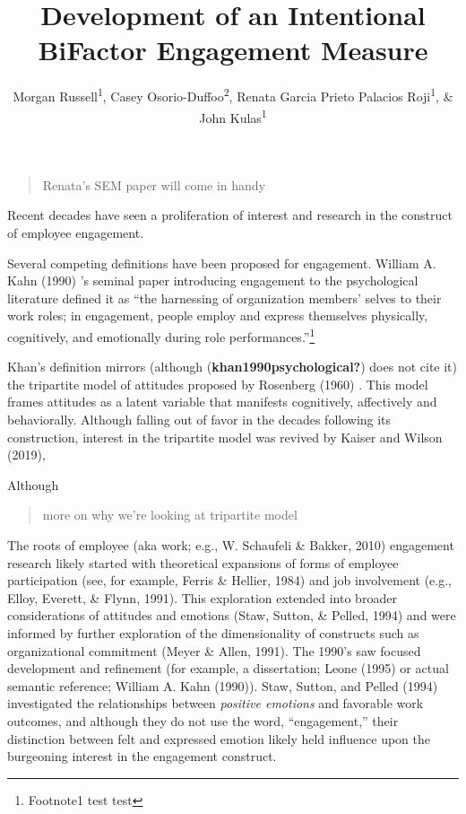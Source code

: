 \documentclass[
  english,
  man]{apa6}
\title{Development of an Intentional BiFactor Engagement Measure}
\author{Morgan Russell\textsuperscript{1}, Casey Osorio-Duffoo\textsuperscript{2}, Renata Garcia Prieto Palacios Roji\textsuperscript{1}, \& John Kulas\textsuperscript{1}}
\date{}
\affiliation{\vspace{0.5cm}\textsuperscript{1} Montclair State University\\\textsuperscript{2} Harver}
\begin{document}
\maketitle

\begin{quote}
Renata's SEM paper will come in handy
\end{quote}

Recent decades have seen a proliferation of interest and research in the construct of employee engagement.

Several competing definitions have been proposed for engagement. William A. Kahn (1990) 's seminal paper introducing engagement to the psychological literature defined it as ``the harnessing of organization members' selves to their work roles; in engagement, people employ and express themselves physically, cognitively, and emotionally during role performances.''\footnote{Footnote1 test test}

Khan's definition mirrors (although (\textbf{khan1990psychological?}) does not cite it) the tripartite model of attitudes proposed by Rosenberg (1960) . This model frames attitudes as a latent variable that manifests cognitively, affectively and behaviorally. Although falling out of favor in the decades following its construction, interest in the tripartite model was revived by Kaiser and Wilson (2019),

Although

\begin{quote}
more on why we're looking at tripartite model
\end{quote}

The roots of employee (aka work; e.g., W. Schaufeli \& Bakker, 2010) engagement research likely started with theoretical expansions of forms of employee participation (see, for example, Ferris \& Hellier, 1984) and job involvement (e.g., Elloy, Everett, \& Flynn, 1991). This exploration extended into broader considerations of attitudes and emotions (Staw, Sutton, \& Pelled, 1994) and were informed by further exploration of the dimensionality of constructs such as organizational commitment (Meyer \& Allen, 1991). The 1990's saw focused development and refinement (for example, a dissertation; Leone (1995) or actual semantic reference; William A. Kahn (1990)). Staw, Sutton, and Pelled (1994) investigated the relationships between \emph{positive emotions} and favorable work outcomes, and although they do not use the word, ``engagement,'' their distinction between felt and expressed emotion likely held influence upon the burgeoning interest in the engagement construct.
\end{document}
